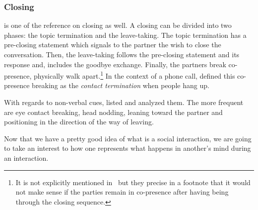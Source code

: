 \documentclass[a4paper,11pt,twoside]{StyleThese}
\begin{document}
\subsubsection{Closing}
\cite{schegloff_1973_opening} is one of the reference on closing as well. A closing can be divided into two phases: the topic termination and the leave-taking.
The topic termination has a pre-closing statement which signals to the partner the wish to close the conversation. Then, the leave-taking follows the pre-closing statement and its response and, includes the goodbye exchange. Finally, the partners break co-presence, \ie physically walk apart.\footnote{It is not explicitly mentioned in~\citep{schegloff_1973_opening}  but they precise in a footnote that it would not make sense if the parties remain in co-presence after having being through the closing sequence.} In the context of a phone call, \cite{clark_1981_telephone} defined this co-presence breaking as the \emph{contact termination} when people hang up.

With regards to non-verbal cues, \cite{knapp_1973_rhetoric} listed and analyzed them. The more frequent are eye contact breaking, head nodding, leaning toward the partner and positioning in the direction of the way of leaving.

\bigskip

Now that we have a pretty good idea of what is a social interaction, we are going to take an interest to how one represents what happens in another's mind during an interaction.
\end{document}
